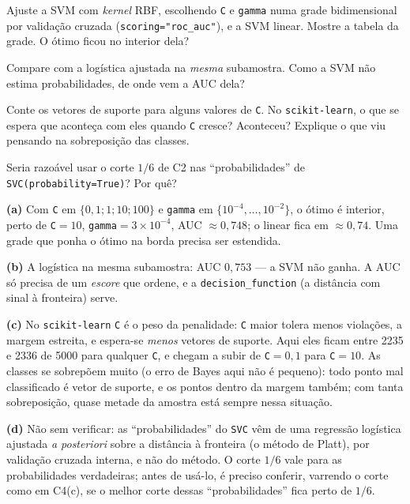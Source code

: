 \documentclass[11pt,a4paper]{article}
\newcommand{\cod}[1]{\texttt{#1}}
\begin{document}
\begin{itens}
  \item Ajuste a SVM com \emph{kernel} RBF, escolhendo \cod{C} e \cod{gamma} numa
        grade bidimensional por validação cruzada (\cod{scoring="roc\_auc"}), e a SVM
        linear. Mostre a tabela da grade. O ótimo ficou no interior dela?
  \item Compare com a logística ajustada na \emph{mesma} subamostra. Como a SVM não
        estima probabilidades, de onde vem a AUC dela?
  \item Conte os vetores de suporte para alguns valores de \cod{C}. No
        \cod{scikit-learn}, o que se espera que aconteça com eles quando \cod{C}
        cresce? Aconteceu? Explique o que viu pensando na sobreposição das classes.
  \item Seria razoável usar o corte $1/6$ de C2 nas ``probabilidades'' de
        \cod{SVC(probability=True)}? Por quê?
\end{itens}

\begin{solucao}
\textbf{(a)} Com \cod{C} em $\{0{,}1;1;10;100\}$ e \cod{gamma} em
$\{10^{-4},\dots,10^{-2}\}$, o ótimo é interior, perto de \cod{C}$=10$,
\cod{gamma}$=3\times10^{-4}$, AUC $\approx0{,}748$; o linear fica em $\approx0{,}74$.
Uma grade que ponha o ótimo na borda precisa ser estendida.

\textbf{(b)} A logística na mesma subamostra: AUC $0{,}753$ --- a SVM não ganha. A AUC
só precisa de um \emph{escore} que ordene, e a \cod{decision\_function} (a distância
com sinal à fronteira) serve.

\textbf{(c)} No \cod{scikit-learn} \cod{C} é o peso da penalidade: \cod{C} maior
tolera menos violações, a margem estreita, e espera-se \emph{menos} vetores de
suporte. Aqui eles ficam entre 2235 e 2336 de 5000 para qualquer \cod{C}, e chegam a
subir de \cod{C}$=0{,}1$ para \cod{C}$=10$. As classes se sobrepõem muito (o erro de Bayes aqui não é pequeno): todo ponto
mal classificado é vetor de suporte, e os pontos dentro da margem também; com tanta
sobreposição, quase metade da amostra está sempre nessa situação.

\textbf{(d)} Não sem verificar: as ``probabilidades'' do \cod{SVC} vêm de uma regressão
logística ajustada \emph{a posteriori} sobre a distância à fronteira (o método de
Platt), por validação cruzada interna, e não do método. O corte $1/6$ vale para as
probabilidades verdadeiras; antes de usá-lo, é preciso conferir, varrendo o corte como
em C4(c), se o melhor corte dessas ``probabilidades'' fica perto de $1/6$.
\end{solucao}
\end{document}
